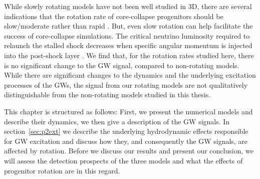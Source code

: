 While slowly rotating models have not been well studied in 3D, there are several
indications that the rotation rate of core-collapse progenitors should be slow/moderate 
rather than rapid \citep{heger_05,beck_12,mosser_12,popov_12,noutsos_13,cantiello_14,deheuvels_14}. 
But, even slow rotation can help facilitate the success of core-collapse
simulations. The critical neutrino luminosity required to relaunch the stalled shock decreases when 
specific angular momentum is injected into the post-shock layer \cite{iwakami_14,nakamura_14}.
We find that, for the rotation rates studied here, there is no significant change to
the GW signal, compared to non-rotating models. While there are significant changes to the dynamics
and the underlying excitation processes of the GWs, the signal from our rotating models are not qualitatively
distinguishable from the non-rotating models studied in this thesis. 

This chapter is structured as follows: First, we present the numerical models and describe their dynamics,
we then give a description of the GW signals. In section~\ref{sec:p2ext} we describe the underlying hydrodynamic
effects responsible for GW excitation and discuss how they, and consequently the GW signals, are affected by rotation. 
Before we discuss our results and present our conclusion, we will assess the detection prospects of the three
models and what the effects of progenitor rotation are in this regard.  


